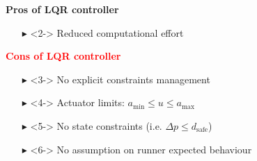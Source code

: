 \documentclass[9pt, aspectratio=169]{beamer}
\begin{document}
\begin{frame}
\begin{columns}
\begin{column}{0.40\textwidth}
\begin{block}{}
\centering
\textcolor{mygreen}{\textbf{Pros of LQR controller}}
\begin{itemize}
\footnotesize
	\item[$\blacktriangleright$]<2-> Reduced computational effort
\end{itemize}
\end{block}
\vspace{-0.2cm}
\begin{block}{}
\centering
\textcolor{red}{\textbf{Cons of LQR controller}} \\
\begin{itemize}
\footnotesize
	\item[$\blacktriangleright$]<3-> No explicit constraints management
	\item[$\blacktriangleright$]<4-> Actuator limits: $a_\text{min} \leq u \leq a_\text{max}$
	\item[$\blacktriangleright$]<5-> No state constraints (i.e. $\Delta p \leq d_\text{safe}$)
	\item[$\blacktriangleright$]<6-> No assumption on runner expected behaviour
\end{itemize}
\end{block}
\end{column}

\end{columns}
\end{frame}
\end{document}

